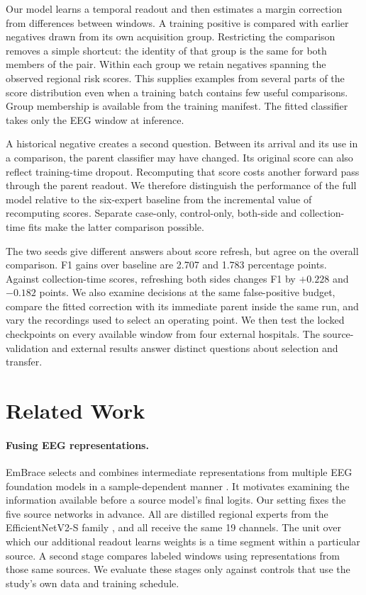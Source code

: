 \documentclass{article}
\begin{document}
Our model learns a temporal readout and then estimates a margin correction from differences between windows. A training positive is compared with earlier negatives drawn from its own acquisition group. Restricting the comparison removes a simple shortcut: the identity of that group is the same for both members of the pair. Within each group we retain negatives spanning the observed regional risk scores. This supplies examples from several parts of the score distribution even when a training batch contains few useful comparisons. Group membership is available from the training manifest. The fitted classifier takes only the EEG window at inference.

A historical negative creates a second question. Between its arrival and its use in a comparison, the parent classifier may have changed. Its original score can also reflect training-time dropout. Recomputing that score costs another forward pass through the parent readout. We therefore distinguish the performance of the full model relative to the six-expert baseline from the incremental value of recomputing scores. Separate case-only, control-only, both-side and collection-time fits make the latter comparison possible.

The two seeds give different answers about score refresh, but agree on the overall comparison. F1 gains over baseline are 2.707 and 1.783 percentage points. Against collection-time scores, refreshing both sides changes F1 by $+0.228$ and $-0.182$ points. We also examine decisions at the same false-positive budget, compare the fitted correction with its immediate parent inside the same run, and vary the recordings used to select an operating point. We then test the locked checkpoints on every available window from four external hospitals. The source-validation and external results answer distinct questions about selection and transfer.

\section{Related Work}
\paragraph{Fusing EEG representations.}
EmBrace selects and combines intermediate representations from multiple EEG foundation models in a sample-dependent manner \citep{jia2026}. It motivates examining the information available before a source model's final logits. Our setting fixes the five source networks in advance. All are distilled regional experts from the EfficientNetV2-S family \citep{tan2021}, and all receive the same 19 channels. The unit over which our additional readout learns weights is a time segment within a particular source. A second stage compares labeled windows using representations from those same sources. We evaluate these stages only against controls that use the study's own data and training schedule.
\end{document}
